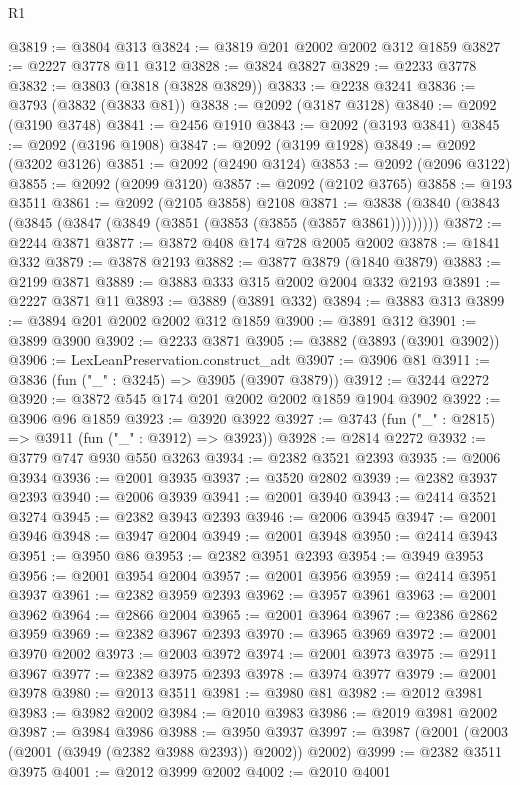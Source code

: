 \begin{lexlean}{R1}
\begin{coremodule}
@3819 := @3804 @313
@3824 := @3819 @201 @2002 @2002 @312 @1859
@3827 := @2227 @3778 @11 @312
@3828 := @3824 @3827
@3829 := @2233 @3778
@3832 := @3803 (@3818 (@3828 @3829))
@3833 := @2238 @3241
@3836 := @3793 (@3832 (@3833 @81))
@3838 := @2092 (@3187 @3128)
@3840 := @2092 (@3190 @3748)
@3841 := @2456 @1910
@3843 := @2092 (@3193 @3841)
@3845 := @2092 (@3196 @1908)
@3847 := @2092 (@3199 @1928)
@3849 := @2092 (@3202 @3126)
@3851 := @2092 (@2490 @3124)
@3853 := @2092 (@2096 @3122)
@3855 := @2092 (@2099 @3120)
@3857 := @2092 (@2102 @3765)
@3858 := @193 @3511
@3861 := @2092 (@2105 @3858) @2108
@3871 := @3838 (@3840 (@3843 (@3845 (@3847 (@3849 (@3851 (@3853 (@3855 (@3857 @3861)))))))))
@3872 := @2244 @3871
@3877 := @3872 @408 @174 @728 @2005 @2002
@3878 := @1841 @332
@3879 := @3878 @2193
@3882 := @3877 @3879 (@1840 @3879)
@3883 := @2199 @3871
@3889 := @3883 @333 @315 @2002 @2004 @332 @2193
@3891 := @2227 @3871 @11
@3893 := @3889 (@3891 @332)
@3894 := @3883 @313
@3899 := @3894 @201 @2002 @2002 @312 @1859
@3900 := @3891 @312
@3901 := @3899 @3900
@3902 := @2233 @3871
@3905 := @3882 (@3893 (@3901 @3902))
@3906 := LexLeanPreservation.construct_adt
@3907 := @3906 @81
@3911 := @3836 (fun ("_" : @3245) => @3905 (@3907 @3879))
@3912 := @3244 @2272
@3920 := @3872 @545 @174 @201 @2002 @2002 @1859 @1904 @3902
@3922 := @3906 @96 @1859
@3923 := @3920 @3922
@3927 := @3743 (fun ("_" : @2815) => @3911 (fun ("_" : @3912) => @3923))
@3928 := @2814 @2272
@3932 := @3779 @747 @930 @550 @3263
@3934 := @2382 @3521 @2393
@3935 := @2006 @3934
@3936 := @2001 @3935
@3937 := @3520 @2802
@3939 := @2382 @3937 @2393
@3940 := @2006 @3939
@3941 := @2001 @3940
@3943 := @2414 @3521 @3274
@3945 := @2382 @3943 @2393
@3946 := @2006 @3945
@3947 := @2001 @3946
@3948 := @3947 @2004
@3949 := @2001 @3948
@3950 := @2414 @3943
@3951 := @3950 @86
@3953 := @2382 @3951 @2393
@3954 := @3949 @3953
@3956 := @2001 @3954 @2004
@3957 := @2001 @3956
@3959 := @2414 @3951 @3937
@3961 := @2382 @3959 @2393
@3962 := @3957 @3961
@3963 := @2001 @3962
@3964 := @2866 @2004
@3965 := @2001 @3964
@3967 := @2386 @2862 @3959
@3969 := @2382 @3967 @2393
@3970 := @3965 @3969
@3972 := @2001 @3970 @2002
@3973 := @2003 @3972
@3974 := @2001 @3973
@3975 := @2911 @3967
@3977 := @2382 @3975 @2393
@3978 := @3974 @3977
@3979 := @2001 @3978
@3980 := @2013 @3511
@3981 := @3980 @81
@3982 := @2012 @3981
@3983 := @3982 @2002
@3984 := @2010 @3983
@3986 := @2019 @3981 @2002
@3987 := @3984 @3986
@3988 := @3950 @3937
@3997 := @3987 (@2001 (@2003 (@2001 (@3949 (@2382 @3988 @2393)) @2002)) @2002)
@3999 := @2382 @3511 @3975
@4001 := @2012 @3999 @2002
@4002 := @2010 @4001

\end{coremodule}
\end{lexlean}
